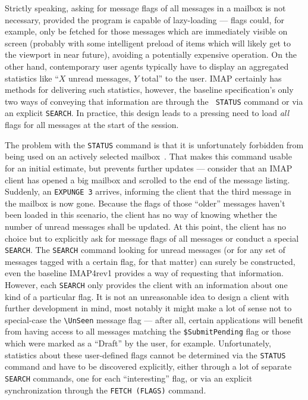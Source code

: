 \documentclass[trojita]{subfiles}
\begin{document}
Strictly speaking, asking for message flags of all messages in a mailbox is not necessary, provided the program is
capable of lazy-loading --- flags could, for example, only be fetched for those messages which are immediately visible on
screen (probably with some intelligent preload of items which will likely get to the viewport in near future), avoiding
a potentially expensive operation.  On the other hand, contemporary user agents typically have to display an aggregated
statistics like ``$X$ unread messages, $Y$ total'' to the user.  IMAP certainly has methods for delivering such
statistics, however, the baseline specification's only two ways of conveying that information are through the {\tt
STATUS} command or via an explicit {\tt SEARCH}.  In practice, this design leads to a pressing need to load {\em all}
flags for all messages at the start of the session.

The problem with the {\tt STATUS} command is that it is unfortunately forbidden from being used on an actively selected
mailbox~\cite[p. 43]{rfc3501}.  That makes this command usable for an initial estimate, but prevents further updates --- consider
that an IMAP client has opened a big mailbox and scrolled to the end of the message listing.  Suddenly, an {\tt *
EXPUNGE 3} arrives, informing the client that the third message in the mailbox is now gone.  Because the flags of those
``older'' messages haven't been loaded in this scenario, the client has no way of knowing whether the number of unread
messages shall be updated.  At this point, the client has no choice but to explicitly ask for message flags of all
messages or conduct a special {\tt SEARCH}.  The {\tt SEARCH} command looking for unread messages (or for any set of
messages tagged with a certain flag, for that matter) can surely be constructed, even the baseline IMAP4rev1 provides a
way of requesting that information.  However, each {\tt SEARCH} only provides the client with an information about one
kind of a particular flag.  It is not an unreasonable idea to design a client with further development in mind, most
notably it might make a lot of sense not to special-case the {\tt {\textbackslash}UnSeen} message flag --- after all, certain
applications will benefit from having access to all messages matching the {\tt \$SubmitPending} flag or those which were
marked as a ``Draft'' by the user, for example.  Unfortunately, statistics about these user-defined flags cannot be
determined via the {\tt STATUS} command and have to be discovered explicitly, either through a lot of separate {\tt
SEARCH} commands, one for each ``interesting'' flag, or via an explicit synchronization through the {\tt FETCH (FLAGS)}
command.
\end{document}
